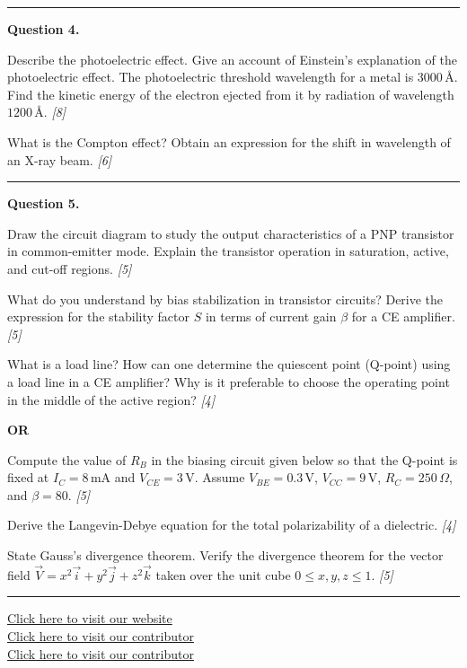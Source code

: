 \documentclass[11pt,a4paper]{article}
\newcommand{\pts}[1]{\hfill   \textit{[#1]}}
\begin{document}
\medskip\rule{\linewidth}{0.2pt}




\noindent   \textbf{Question 4.}

\begin{parts}
  \item Describe the photoelectric effect. Give an account of Einstein's explanation of the photoelectric effect. The photoelectric threshold wavelength for a metal is $3000\, \text{\AA}$. Find the kinetic energy of the electron ejected from it by radiation of wavelength $1200\, \text{\AA}$. \pts{8}
  \item What is the Compton effect? Obtain an expression for the shift in wavelength of an X-ray beam. \pts{6}
\end{parts}

\medskip\rule{\linewidth}{0.2pt}




\noindent   \textbf{Question 5.}

\begin{parts}
  \item Draw the circuit diagram to study the output characteristics of a PNP transistor in common-emitter mode. Explain the transistor operation in saturation, active, and cut-off regions. \pts{5}
  \item What do you understand by bias stabilization in transistor circuits? Derive the expression for the stability factor $S$ in terms of current gain $\beta$ for a CE amplifier. \pts{5}
  \item What is a load line? How can one determine the quiescent point (Q-point) using a load line in a CE amplifier? Why is it preferable to choose the operating point in the middle of the active region? \pts{4}
\end{parts}
\hfill   \textbf{OR}

\begin{parts}
  \item Compute the value of $R_B$ in the biasing circuit given below so that the Q-point is fixed at $I_C = 8\, \text{mA}$ and $V_{CE} = 3\, \text{V}$. Assume $V_{BE} = 0.3\, \text{V}$, $V_{CC} = 9\, \text{V}$, $R_C = 250\,\Omega$, and $\beta = 80$. \pts{5}
  \item Derive the Langevin-Debye equation for the total polarizability of a dielectric. \pts{4}
  \item State Gauss's divergence theorem. Verify the divergence theorem for the vector field $\vec{V} = x^2 \vec{i} + y^2 \vec{j} + z^2 \vec{k}$ taken over the unit cube $0 \le x, y, z \le 1$. \pts{5}
\end{parts}

\vfill
\rule{\linewidth}{0.4pt}

\begin{center}\small
  \href{https://bhu-exam.vercel.app/}{Click here to visit our website}\\[4pt]
  \href{https://me-aryan.vercel.app/}{Click here to visit our contributor}\\[4pt]
  \href{https://quashan-me.vercel.app/}{Click here to visit our contributor}
\end{center}
\end{document}
